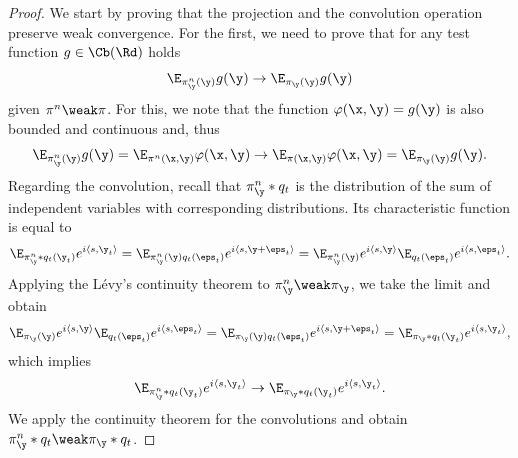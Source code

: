 \begin{proof}
     We start by proving that the projection and the convolution operation preserve weak convergence. For the first, we need to prove that for any test function $g \in \Cb(\Rd)$ holds \begin{equation}
         \E_{\pi^{n}_{\y}(\y)} g(\y) \rightarrow \E_{\pi_{\y}(\y)} g(\y)
     \end{equation} given $\pi^n \weak \pi$. For this, we note that the function $\varphi(\x, \y) = g(\y)$ is also bounded and continuous and, thus
     \begin{equation}
         \E_{\pi^{n}_{\y}(\y)} g(\y) = \E_{\pi^n(\x, \y)}\varphi(\x, \y) \rightarrow \E_{\pi(\x, \y)}\varphi(\x, \y) = \E_{\pi_{\y}(\y)} g(\y).
     \end{equation}
     Regarding the convolution, recall that $\pi^n_{\y} * q_t$ is the distribution of the sum of independent variables with corresponding distributions. Its characteristic function is equal to
     \begin{equation}
         \E_{\pi^n_{\y} * q_t (\y_t)} e^{i \langle s, \y_t \rangle} = \E_{\pi^n_{\y}(\y)q_t(\eps_t)}e^{i \langle s, \y + \eps_t \rangle} = \E_{\pi^n_{\y}(\y)}e^{i\langle s, \y \rangle}\E_{q_t(\eps_t)}e^{i\langle s, \eps_t \rangle}.
     \end{equation}
    Applying the Lévy's continuity theorem to $\pi^n_{\y} \weak \pi_{\y}$, we take the limit and obtain
    \begin{equation} 
        \E_{\pi_{\y}(\y)}e^{i\langle s, \y \rangle}\E_{q_t(\eps_t)}e^{i\langle s, \eps_t \rangle} = \E_{\pi_{\y}(\y)q_t(\eps_t)}e^{i \langle s, \y + \eps_t \rangle} = \E_{\pi_{\y} * q_t (\y_t)} e^{i \langle s, \y_t \rangle},
    \end{equation}
    which implies 
    \begin{equation}
        \E_{\pi^n_{\y} * q_t (\y_t)} e^{i \langle s, \y_t \rangle} \rightarrow \E_{\pi_{\y} * q_t (\y_t)} e^{i \langle s, \y_t \rangle}.
    \end{equation}
    We apply the continuity theorem for the convolutions and obtain $\pi^n_{\y} * q_t \weak \pi_{\y} * q_t$.


\end{proof}
